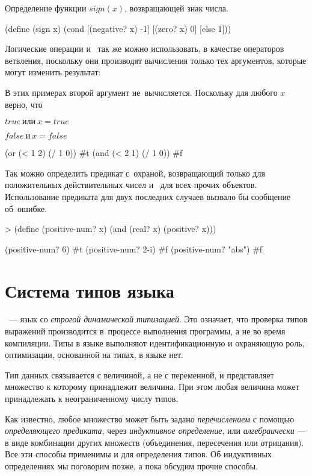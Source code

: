 \begin{example}{\label{example:sign}Определение функции $sign(x)$, возвращающей знак числа.}
\begin{ExampleCode}
(define (sign x)
  (cond
    [(negative? x) -1]
    [(zero? x) 0]
    [else 1]))
\end{ExampleCode}
\end{example}

Логические операции  и~ так же можно использовать, в качестве операторов ветвления, поскольку они производят вычисления только тех аргументов, которые могут изменить результат:

\begin{example}{%
В этих примерах второй аргумент не~вычисляется. Поскольку для любого $x$ верно, что

$true\ \text{или}\ x = true$

$false\ \text{и}\ x = false$}
\REPL
  {(or (< 1 2) (/ 1 0))}
  {\#t}
\REPL
  {(and (< 2 1) (/ 1 0))}
  {\#f}
\end{example}

\begin{example}{Так можно определить предикат с~охраной, возвращающий  только для положительных действительных чисел и~ для всех прочих объектов. Использование предиката  для двух последних случаев вызвало бы сообщение об~ошибке.}
\begin{ExampleCode}
> (define (positive-num? x)
    (and (real? x)
         (positive? x)))
\end{ExampleCode}
\REPL
  {(positive-num? 6)}
  {\#t}
\REPL
  {(positive-num? 2-i)}
  {\#f}
\REPL
  {(positive-num? "abs")}
  {\#f}
\end{example}

\section{Система типов языка \Scheme}%
\Scheme~--- язык со \emph{строгой динамической типизацией}. Это означает, что проверка типов выражений производится в~процессе выполнения программы, а не во время компиляции. Типы в языке выполняют идентификационную и охраняющую роль, оптимизации, основанной на типах, в языке нет.

Тип данных связывается с величиной, а не с переменной, и представляет множество к которому принадлежит величина. При этом любая величина может принадлежать к неограниченному числу типов.

\label{set-definition}Как известно, любое множество может быть задано \emph{перечислением} с помощью \emph{определяющего предиката}, через \emph{индуктивное определение}, или \emph{алгебраически} --- в виде комбинации других множеств (объединения, пересечения или отрицания). Все эти способы применимы и для определения типов. Об индуктивных определениях мы поговорим позже, а пока обсудим прочие способы.

